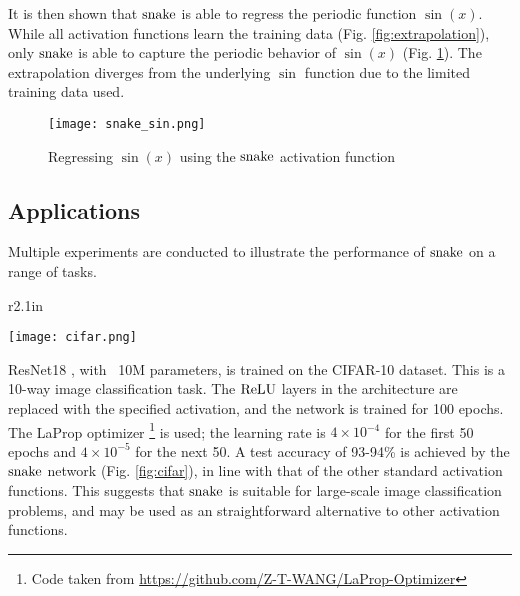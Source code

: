 It is then shown that $ \operatorname{snake} $ is able to regress the periodic function $\sin(x)$. While all activation functions learn the training data (Fig. \ref{fig:extrapolation}), only $ \operatorname{snake} $ is able to capture the periodic behavior of $\sin(x)$ (Fig. \ref{fig:sin_snake}). The extrapolation diverges from the underlying $ \sin $ function due to the limited training data used. \\


\begin{figure}[h]

\centering
\texttt{[image: snake\_sin.png]}
\caption{Regressing $\sin(x)$ using the $ \operatorname{snake} $ activation function}
\label{fig:sin_snake}
\end{figure}

\newpage
\subsection{Applications}
Multiple experiments are conducted to illustrate the performance of $ \operatorname{snake} $ on a range of tasks. \\

\begin{wrapfigure}{r}{2.1in}
  \begin{center}
    \texttt{[image: cifar.png]}
  \end{center}
  \caption{Test accuracy of ResNet18 with different non-linearities}
  \label{fig:cifar}
\end{wrapfigure}

ResNet18 \cite{7780459}, with ~10M parameters, is trained on the CIFAR-10 dataset. This is a 10-way image classification task. The $ \operatorname{ReLU} $ layers in the architecture are replaced with the specified activation, and the network is trained for 100 epochs. The \rm{LaProp} optimizer \footnote{Code taken from \url{https://github.com/Z-T-WANG/LaProp-Optimizer}} \cite{ziyin2020laprop} is used; the learning rate is $4 \times 10^{-4}$ for the first 50 epochs and $4 \times 10^{-5}$ for the next 50. A test accuracy of 93-94\% is achieved by the $ \operatorname{snake} $ network (Fig. \ref{fig:cifar}), in line with that of the other standard activation functions. This suggests that $ \operatorname{snake} $ is suitable for large-scale image classification problems, and may be used as an straightforward alternative to other activation functions. \\


